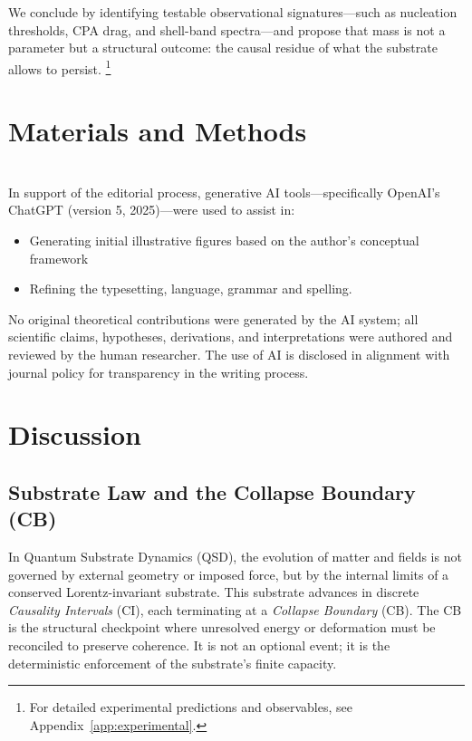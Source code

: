 \documentclass[preprints,article,submit,pdftex,moreauthors]{Definitions/mdpi}
\begin{document}
We conclude by identifying testable observational signatures—such as nucleation thresholds, CPA drag, and shell-band spectra—and propose that mass is not a parameter but a structural outcome: the causal residue of what the substrate allows to persist.
\footnote{For detailed experimental predictions and observables, see Appendix~\ref{app:experimental}.}

\section{Materials and Methods}
\qsdmethodstatement
\\
In support of the editorial process, generative AI tools—specifically OpenAI's ChatGPT (version 5, 2025)—were used to assist in:
\begin{itemize}
    \item Generating initial illustrative figures based on the author’s conceptual framework
    \item Refining the typesetting, language, grammar and spelling.
\end{itemize}

No original theoretical contributions were generated by the AI system; all scientific claims, hypotheses, derivations, and interpretations were authored and reviewed by the human researcher. The use of AI is disclosed in alignment with journal policy for transparency in the writing process.


\section{Discussion}
\subsection{Substrate Law and the Collapse Boundary (CB)}

In Quantum Substrate Dynamics (QSD), the evolution of matter and fields is not governed by external geometry or imposed force, but by the internal limits of a conserved Lorentz-invariant substrate. This substrate advances in discrete \emph{Causality Intervals} (CI), each terminating at a \emph{Collapse Boundary} (CB). The CB is the structural checkpoint where unresolved energy or deformation must be reconciled to preserve coherence. It is not an optional event; it is the deterministic enforcement of the substrate’s finite capacity.
\end{document}
